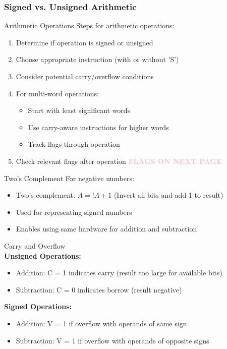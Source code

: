 \subsubsection{Signed vs. Unsigned Arithmetic}

\begin{KR}{Arithmetic Operations}
Steps for arithmetic operations:
\begin{enumerate}
  \item Determine if operation is signed or unsigned
  \item Choose appropriate instruction (with or without 'S')
  \item Consider potential carry/overflow conditions
  \item For multi-word operations:
    \begin{itemize}
      \item Start with least significant words
      \item Use carry-aware instructions for higher words
      \item Track flags through operation
    \end{itemize}
  \item Check relevant flags after operation \textcolor{pink}{\textbf{FLAGS ON NEXT PAGE}}
\end{enumerate}
\end{KR}

\begin{definition}{Two's Complement}
For negative numbers:
\begin{itemize}
  \item Two's complement: $A = !A + 1$ (Invert all bits and add 1 to result)
  \item Used for representing signed numbers
  \item Enables using same hardware for addition and subtraction
\end{itemize}
\end{definition}

\begin{concept}{Carry and Overflow}\\
\textbf{Unsigned Operations:}
\begin{itemize}
  \item Addition: C = 1 indicates carry (result too large for available bits)
  \item Subtraction: C = 0 indicates borrow (result negative)
\end{itemize}

\textbf{Signed Operations:}
\begin{itemize}
  \item Addition: V = 1 if overflow with operands of same sign
  \item Subtraction: V = 1 if overflow with operands of opposite signs
\end{itemize}
\end{concept}

